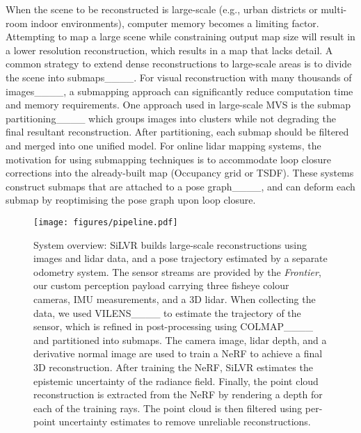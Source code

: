 

When the scene to be reconstructed is large-scale (e.g., urban districts or multi-room indoor environments),  computer memory becomes a limiting factor. Attempting to map a large scene while constraining output map size will result in a lower resolution reconstruction, which results in a map that lacks detail. A common strategy to extend dense reconstructions to large-scale areas is to divide the scene into submaps____. For visual reconstruction with many thousands of images____, a submapping approach can significantly reduce computation time and memory requirements. One approach used in large-scale MVS is the submap partitioning____ which groups images into clusters while not degrading the final resultant reconstruction. After partitioning, each submap should be filtered and merged into one unified model. For online lidar mapping systems, the motivation for using submapping techniques is to accommodate loop closure corrections into the already-built map (Occupancy grid or TSDF). These systems construct submaps that are attached to a pose graph____, and can deform each submap by reoptimising the pose graph upon loop closure.

\begin{figure*}[t]
	\centering
	\texttt{[image: figures/pipeline.pdf]}
	\caption{System overview: SiLVR builds large-scale reconstructions using images and lidar data, and a pose trajectory estimated by a separate odometry system. The sensor streams are provided by the \emph{Frontier}, our custom perception payload carrying three fisheye colour cameras, IMU measurements, and a 3D lidar. When collecting the data, we used VILENS____ to estimate the trajectory of the sensor, which is refined in post-processing using COLMAP____ and partitioned into submaps. The camera image, lidar depth, and a derivative normal image are used to train a NeRF to achieve a final 3D reconstruction. After training the NeRF, SiLVR estimates the epistemic uncertainty of the radiance field. Finally, the point cloud reconstruction is extracted from the NeRF by rendering a depth for each of the training rays. The point cloud is then filtered using per-point uncertainty estimates to remove unreliable reconstructions.}
	\label{fig:sys_overview}
\end{figure*}

